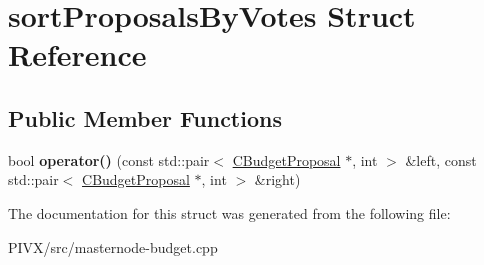\hypertarget{structsort_proposals_by_votes}{}\section{sort\+Proposals\+By\+Votes Struct Reference}
\label{structsort_proposals_by_votes}
\subsection*{Public Member Functions}
\begin{DoxyCompactItemize}
\item 
\mbox{\label{structsort_proposals_by_votes_a277efd32d95c5d0c534a88d6904689de}} 
bool {\bfseries operator()} (const std\+::pair$<$ \mbox{\hyperlink{class_c_budget_proposal}{C\+Budget\+Proposal}} $\ast$, int $>$ \&left, const std\+::pair$<$ \mbox{\hyperlink{class_c_budget_proposal}{C\+Budget\+Proposal}} $\ast$, int $>$ \&right)
\end{DoxyCompactItemize}


The documentation for this struct was generated from the following file\+:\begin{DoxyCompactItemize}
\item 
P\+I\+V\+X/src/masternode-\/budget.\+cpp\end{DoxyCompactItemize}
